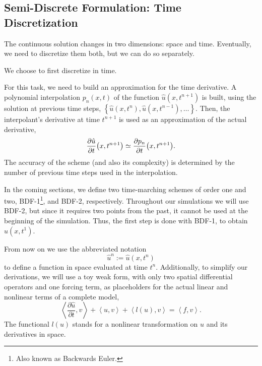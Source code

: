 \documentclass[../../thesis.tex]{subfiles}
\newcommand{\inner}[2]{\left<#1, #2\right>}
\begin{document}
\subsection{Semi-Discrete Formulation: Time Discretization}
The continuous solution changes in two dimensions: space and time.
Eventually, we need to discretize them both, but we can do so separately.

We choose to first discretize in time. 



For this task, we need to build an approximation for the time derivative.
A polynomial interpolation $p_n(x, t)$ of the function 
$\hat{u}(x,t^{n+1})$ is built, 
using the solution at previous time steps, 
$\left\{\hat{u}(x,t^{n}), \hat{u}(x,t^{n-1}), \ldots\right\}$.
Then, the interpolant's derivative at time $t^{n+1}$ is used as an approximation of the actual derivative,
\begin{equation}
    \pdv{\hat{u}}{t} \qty(x, t^{n+1}) \simeq \pdv{p_n}{t} \qty(x, t^{n+1}).
\end{equation}
The accuracy of the scheme (and also its complexity) is determined by the number of previous time steps used in the interpolation. 

In the coming sections, we define two time-marching schemes of order one and two, 
BDF-1\footnote{Also known as Backwards Euler.}, and BDF-2, respectively.
Throughout our simulations we will use BDF-2, 
but since it requires two points from the past, 
it cannot be used at the beginning of the simulation. 
Thus, the first step is done with BDF-1, to obtain $\hat{u}(x,t^1)$.

From now on we use the abbreviated notation
\begin{equation}
    \hat{u}^n := \hat{u}(x,t^n)
\end{equation}
to define a function in space evaluated at time $t^n$.
Additionally, to simplify our derivations, we will use a toy weak form,
with only two spatial differential operators and one forcing term, 
as placeholders for the actual linear and nonlinear terms of a complete model,
\begin{equation}
        \inner{\frac{\partial \hat{u}}{\partial t}}{v}
        + \inner{u}{v} 
        + \inner{l(u)}{v} 
        =  
        \inner{f}{v}.
\end{equation}
The functional $l(u)$ stands for a nonlinear transformation on $u$ and its derivatives in space.
\end{document}
